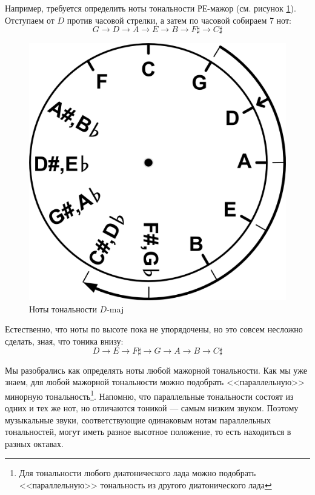 Например, требуется определить ноты тональности РЕ-мажор (см. рисунок \ref{fig:harmony:kvinto-kvarto:d-maj}). Отступаем от $D$ против часовой стрелки, а затем по часовой собираем 7 нот:
\[
    G\rightarrow 
    D\rightarrow 
    A\rightarrow 
    E\rightarrow 
    B\rightarrow 
    {F\sharp}\rightarrow
    {C\sharp}
\]

\begin{figure}[!ht]
    \centering
    \includegraphics[scale=0.5]{fig/kvinto-kvarto/kvinto-kvarto-d-maj} 
    \caption{Ноты тональности $D$-maj}\label{fig:harmony:kvinto-kvarto:d-maj}
\end{figure}

Естественно, что ноты по высоте пока не упорядочены, но это совсем несложно сделать, зная, что тоника внизу:
\[
    D\rightarrow 
    E\rightarrow 
    {F\sharp}\rightarrow
    G\rightarrow 
    A\rightarrow 
    B\rightarrow 
    {C\sharp}
\]

Мы разобрались как определять ноты любой мажорной тональности. Как мы уже знаем, для любой мажорной тональности можно подобрать <<параллельную>> минорную тональность\footnote{Для тональности любого диатонического лада можно подобрать <<параллельную>> тональность из другого диатонического лада}. Напомню, что параллельные тональности состоят из одних и тех же нот, но отличаются тоникой --- самым низким звуком. Поэтому музыкальные звуки, соответствующие одинаковым нотам параллельных тональностей, могут иметь разное высотное положение, то есть находиться в разных октавах.


